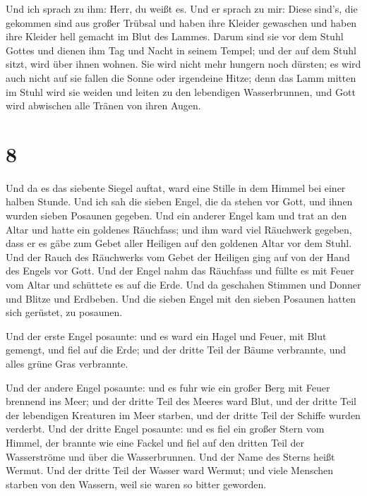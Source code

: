  Und ich sprach zu ihm: Herr, du weißt es. Und er sprach
zu mir: Diese sind's, die gekommen sind aus großer Trübsal und haben
ihre Kleider gewaschen und haben ihre Kleider hell gemacht im Blut des
Lammes.  Darum sind sie vor dem Stuhl Gottes und dienen
ihm Tag und Nacht in seinem Tempel; und der auf dem Stuhl sitzt, wird
über ihnen wohnen.  Sie wird nicht mehr hungern noch
dürsten; es wird auch nicht auf sie fallen die Sonne oder irgendeine
Hitze;  denn das Lamm mitten im Stuhl wird sie weiden und
leiten zu den lebendigen Wasserbrunnen, und Gott wird abwischen alle
Tränen von ihren Augen.

\hypertarget{section-7}{%
\section{8}\label{section-7}}

 Und da es das siebente Siegel auftat, ward eine Stille in
dem Himmel bei einer halben Stunde.  Und ich sah die
sieben Engel, die da stehen vor Gott, und ihnen wurden sieben Posaunen
gegeben.  Und ein anderer Engel kam und trat an den Altar
und hatte ein goldenes Räuchfass; und ihm ward viel Räuchwerk gegeben,
dass er es gäbe zum Gebet aller Heiligen auf den goldenen Altar vor dem
Stuhl.  Und der Rauch des Räuchwerks vom Gebet der
Heiligen ging auf von der Hand des Engels vor Gott.  Und
der Engel nahm das Räuchfass und füllte es mit Feuer vom Altar und
schüttete es auf die Erde. Und da geschahen Stimmen und Donner und
Blitze und Erdbeben.  Und die sieben Engel mit den sieben
Posaunen hatten sich gerüstet, zu posaunen.

 Und der erste Engel posaunte: und es ward ein Hagel und
Feuer, mit Blut gemengt, und fiel auf die Erde; und der dritte Teil der
Bäume verbrannte, und alles grüne Gras verbrannte.

 Und der andere Engel posaunte: und es fuhr wie ein großer
Berg mit Feuer brennend ins Meer; und der dritte Teil des Meeres ward
Blut,  und der dritte Teil der lebendigen Kreaturen im
Meer starben, und der dritte Teil der Schiffe wurden verderbt.
 Und der dritte Engel posaunte: und es fiel ein großer
Stern vom Himmel, der brannte wie eine Fackel und fiel auf den dritten
Teil der Wasserströme und über die Wasserbrunnen.  Und
der Name des Sterns heißt Wermut. Und der dritte Teil der Wasser ward
Wermut; und viele Menschen starben von den Wassern, weil sie waren so
bitter geworden.

